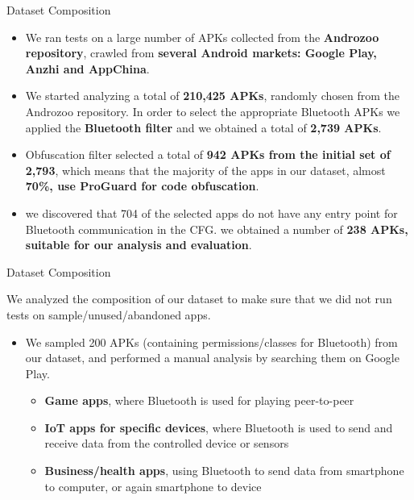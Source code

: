 \documentclass[10pt]{beamer}
\begin{document}
\begin{frame}[fragile]{Dataset Composition}

  \begin{itemize}

  \item We ran tests on a large number of APKs collected from the
    {\bf Androzoo repository}, crawled from {\bf several Android markets:
      Google Play, Anzhi and AppChina}.

  \item We started analyzing a total of {\bf 210,425 APKs}, randomly
    chosen from the Androzoo repository. In order to select the
    appropriate Bluetooth APKs we applied the {\bf Bluetooth filter}
    and we obtained a total of {\bf 2,739 APKs}.

  \item Obfuscation filter selected a total of {\bf 942 APKs from the
      initial set of 2,793}, which means that the majority of the apps
    in our dataset, almost {\bf 70\%, use ProGuard for code
      obfuscation}.

  \item we discovered that 704 of the selected apps do not have any
    entry point for Bluetooth communication in the CFG. we obtained a
    number of {\bf 238 APKs, suitable for our analysis and
      evaluation}.
    


  \end{itemize}

  
\end{frame}

\begin{frame}[fragile]{Dataset Composition}

  We analyzed the composition of our dataset to make sure that we did
  not run tests on sample/unused/abandoned apps.
  
  \begin{itemize}
    
  \item We sampled 200 APKs (containing permissions/classes for
    Bluetooth) from our dataset, and performed a manual analysis by
    searching them on Google Play.
    \begin{itemize}

    \item {\bf Game apps}, where Bluetooth is used for playing peer-to-peer

    \item {\bf IoT apps for specific devices}, where Bluetooth is used
      to send and receive data from the controlled device or sensors

    \item {\bf Business/health apps}, using Bluetooth to send data
      from smartphone to computer, or again smartphone to device
    
  \end{itemize}

  \end{itemize}
  
\end{frame}
\end{document}

